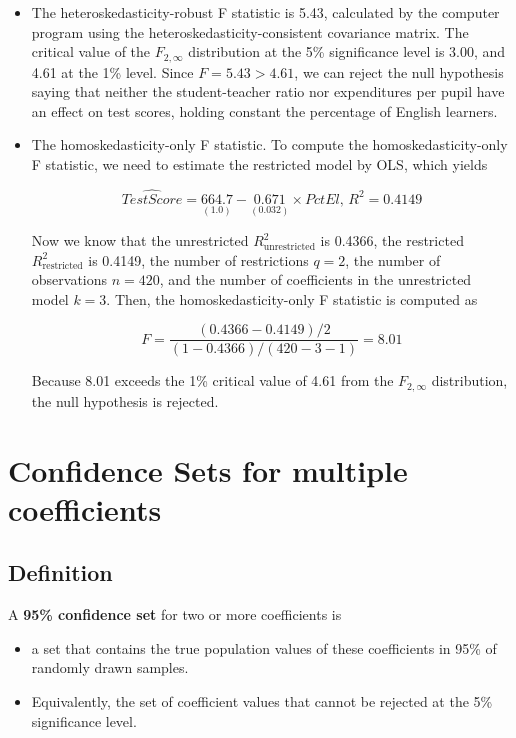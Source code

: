 \documentclass[a4paper,11pt]{article}
\begin{document}
\begin{itemize}
\item The heteroskedasticity-robust F statistic is 5.43, calculated by the
computer program using the heteroskedasticity-consistent covariance
matrix. The critical value of the \(F_{2,\infty}\) distribution at the
5\% significance level is 3.00, and 4.61 at the 1\% level. Since \(F =
  5.43 > 4.61\), we can reject the null hypothesis saying that neither
the student-teacher ratio nor expenditures per pupil have an effect
on test scores, holding constant the percentage of English
learners.

\item The homoskedasticity-only F statistic. To compute the
homoskedasticity-only F statistic, we need to estimate the
restricted model by OLS, which yields

\begin{equation*}
\widehat{TestScore} = \underset{{\displaystyle (1.0)}}{664.7}
- \underset{\displaystyle (0.032)}{0.671} \times PctEl,\, R^2 = 0.4149
\end{equation*}

Now we know that the unrestricted \(R^2_{\text{unrestricted}}\) is
0.4366, the restricted \(R^2_{\text{restricted}}\) is 0.4149, the
number of restrictions \(q=2\), the number of observations \(n = 420\),
and the number of coefficients in the unrestricted model \(k =
  3\). Then, the homoskedasticity-only F statistic is computed as

\[F=\frac{(0.4366 - 0.4149)/2}{(1-0.4366)/(420-3-1)} = 8.01 \]

Because 8.01 exceeds the 1\% critical value of 4.61 from the
\(F_{2,\infty}\) distribution, the null hypothesis is rejected.
\end{itemize}


\section{Confidence Sets for multiple coefficients}
\label{sec:orgc3499c8}

\subsection{Definition}
\label{sec:org5332cd8}

A \textbf{95\% confidence set} for two or more coefficients is
\begin{itemize}
\item a set that contains the true population values of these coefficients
in 95\% of randomly drawn samples.
\item Equivalently, the set of coefficient values that cannot be rejected
at the 5\% significance level.
\end{itemize}
\end{document}
